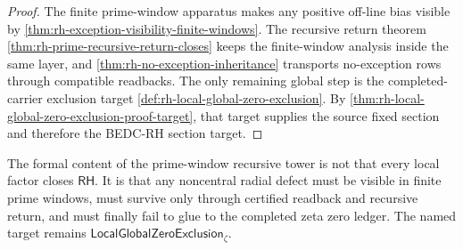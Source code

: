 \begin{proof}
The finite prime-window apparatus makes any positive off-line bias visible
by \autoref{thm:rh-exception-visibility-finite-windows}. The recursive
return theorem \autoref{thm:rh-prime-recursive-return-closes} keeps the
finite-window analysis inside the same layer, and
\autoref{thm:rh-no-exception-inheritance} transports no-exception rows
through compatible readbacks. The only remaining global step is the
completed-carrier exclusion target
\autoref{def:rh-local-global-zero-exclusion}. By
\autoref{thm:rh-local-global-zero-exclusion-proof-target}, that target
supplies the source fixed section and therefore the BEDC-RH section target.
\end{proof}

\begin{principle}
\label{prin:rh-prime-recursive-no-exception-boundary}
The formal content of the prime-window recursive tower is not that every
local factor closes $\mathsf{RH}$. It is that any noncentral radial defect
must be visible in finite prime windows, must survive only through certified
readback and recursive return, and must finally fail to glue to the
completed zeta zero ledger. The named target remains
$\mathsf{LocalGlobalZeroExclusion}_{\zeta}$.
\end{principle}
